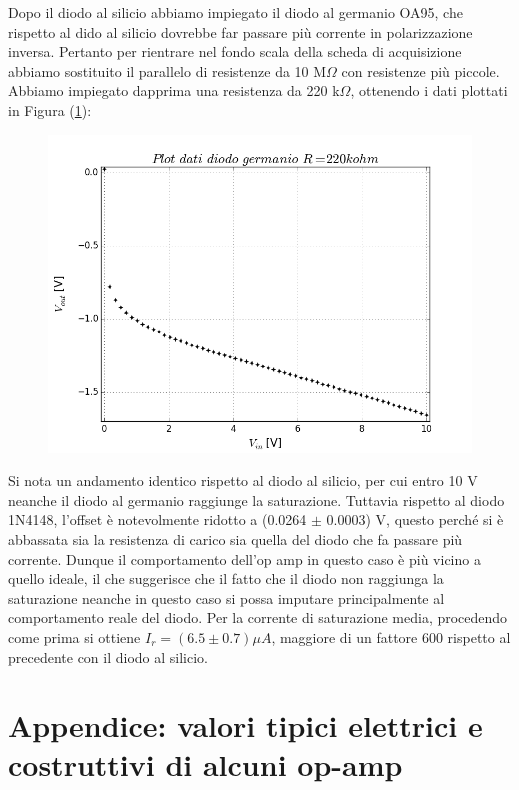 \documentclass[journal, a4paper]{IEEEtran}
\begin{document}
Dopo il diodo al silicio abbiamo impiegato il diodo al germanio OA95, che rispetto al dido al silicio dovrebbe far passare più corrente in polarizzazione inversa. Pertanto per rientrare nel fondo scala della scheda di acquisizione abbiamo sostituito il parallelo di resistenze da 10 M$\Omega$ con resistenze più piccole. Abbiamo impiegato dapprima una resistenza da 220 k$\Omega$, ottenendo i dati plottati in Figura (\ref{plotdiodo_germanio_220k}):\\

\begin{figure}[htp]
\caption{}
\label{plotdiodo_germanio_220k}
\centering
\includegraphics[scale=.35]{plotdiodo_germanio_220k}
\end{figure}

Si nota un andamento identico rispetto al diodo al silicio, per cui entro 10 V neanche il diodo al germanio raggiunge la saturazione. Tuttavia rispetto al diodo 1N4148, l'offset è notevolmente ridotto a (0.0264 $\pm$ 0.0003) V, questo perché si è abbassata sia la resistenza di carico sia quella del diodo che fa passare più corrente. Dunque il comportamento dell'op amp in questo caso è più vicino a quello ideale, il che suggerisce che il fatto che il diodo non raggiunga la saturazione neanche in questo caso si possa imputare principalmente al comportamento reale del diodo. Per la corrente di saturazione media, procedendo come prima si ottiene $I_r = (6.5 \pm 0.7) \mu A$, maggiore di un fattore 600 rispetto al precedente con il diodo al silicio.

\section{Appendice: valori tipici elettrici e costruttivi di alcuni op-amp}
\end{document}
